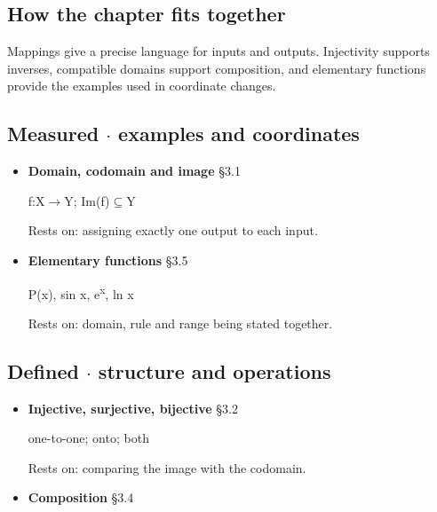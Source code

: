 \documentclass[11pt]{article}
\begin{document}
\begin{keepsection}
\section{How the chapter fits together}

Mappings give a precise language for inputs and outputs. Injectivity supports inverses, compatible domains support composition, and elementary functions provide the examples used in coordinate changes.

\subsection{Measured \ensuremath{\cdot} examples and coordinates}

\begin{itemize}
\item {}
\textbf{Domain, codomain and image} \hfill{\small\color{FAUblue}§3.1}

f:X\ensuremath{\to}Y; Im(f)\ensuremath{\subseteq}Y

Rests on: assigning exactly one output to each input.
\item {}
\textbf{Elementary functions} \hfill{\small\color{FAUblue}§3.5}

P(x), sin x, e\textsuperscript{x}, ln x

Rests on: domain, rule and range being stated together.
\end{itemize}

\subsection{Defined \ensuremath{\cdot} structure and operations}

\begin{itemize}
\item {}
\textbf{Injective, surjective, bijective} \hfill{\small\color{FAUblue}§3.2}

one-to-one; onto; both

Rests on: comparing the image with the codomain.
\item {}
\textbf{Composition} \hfill{\small\color{FAUblue}§3.4}


\end{itemize}
\end{keepsection}
\end{document}
